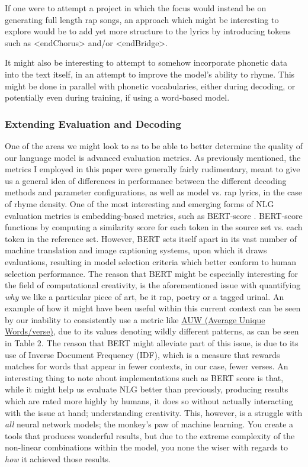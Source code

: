 If one were to attempt a project in which the focus would instead be on generating full length rap songs, an approach which might be interesting to explore would be to add yet more structure to the lyrics by introducing tokens such as \textless{}endChorus\textgreater{} and/or \textless{}endBridge\textgreater{}.

It might also be interesting to attempt to somehow incorporate phonetic data into the text itself, in an attempt to improve the model’s ability to rhyme. This might be done in parallel with phonetic vocabularies, either during decoding, or potentially even during training, if using a word-based model.

\subsubsection{Extending Evaluation and Decoding}
\label{sec:extending-evaluation}

One of the areas we might look to as to be able to better determine the quality of our language model is advanced evaluation metrics. As previously mentioned, the metrics I employed in this paper were generally fairly rudimentary, meant to give us a general idea of differences in performance between the different decoding methods and parameter configurations, as well as model vs. rap lyrics, in the case of rhyme density. One of the most interesting and emerging forms of NLG evaluation metrics is embedding-based metrics, such as BERT-score \cite{ZhangTianyi2019BETG}. BERT-score functions by computing a similarity score for each token in the source set vs. each token in the reference set. However, BERT sets itself apart in its vast number of machine translation and image captioning systems, upon which it draws evaluations, resulting in model selection criteria which better conform to human selection performance. The reason that BERT might be especially interesting for the field of computational creativity, is the aforementioned issue with quantifying \textit{why} we like a particular piece of art, be it rap, poetry or a tagged urinal. An example of how it might have been useful within this current context can be seen by our inability to consistently use a metric like \hyperref[para:avg-unique-words/v]{AUW (Average Unique Words/verse)}, due to its values denoting wildly different patterns, as can be seen in Table 2. The reason that BERT might alleviate part of this issue, is due to its use of Inverse Document Frequency (IDF), which is a measure that rewards matches for words that appear in fewer contexts, in our case, fewer verses. An interesting thing to note about implementations such as BERT score is that, while it might help us evaluate NLG better than previously, producing results which are rated more highly by humans, it does so without actually interacting with the issue at hand; understanding creativity. This, however, is a struggle with \textit{all} neural network models; the monkey’s paw of machine learning. You create a tools that produces wonderful results, but due to the extreme complexity of the non-linear combinations within the model, you none the wiser with regards to \textit{how} it achieved those results.

